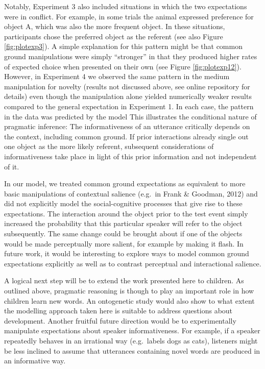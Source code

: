 \documentclass[10pt, letterpaper]{article}
\begin{document}
Notably, Experiment 3 also included situations in which the two
expectations were in conflict. For example, in some trials the animal
expressed preference for object A, which was also the more frequent
object. In these situations, participants chose the preferred object as
the referent (see also Figure \ref{fig:plotexp3}). A simple explanation
for this pattern might be that common ground manipulations were simply
``stronger'' in that they produced higher rates of expected choice when
presented on their own (see Figure \ref{fig:plotexp12}). However, in
Experiment 4 we observed the same pattern in the medium manipulation for
novelty (results not discussed above, see online repository for details)
even though the manipulation alone yielded numerically weaker results
compared to the general expectation in Experiment 1. In each case, the
pattern in the data was predicted by the model This illustrates the
conditional nature of pragmatic inference: The informativeness of an
utterance critically depends on the context, including common ground. If
prior interactions already single out one object as the more likely
referent, subsequent considerations of informativeness take place in
light of this prior information and not independent of it.

In our model, we treated common ground expectations as equivalent to
more basic manipulations of contextual salience (e.g.~in Frank \&
Goodman, 2012) and did not explicitly model the social-cognitive
processes that give rise to these expectations. The interaction around
the object prior to the test event simply increased the probability that
this particular speaker will refer to the object subsequently. The same
change could be brought about if one of the objects would be made
perceptually more salient, for example by making it flash. In future
work, it would be interesting to explore ways to model common ground
expectations explicitly as well as to contrast perceptual and
interactional salience.

A logical next step will be to extend the work presented here to
children. As outlined above, pragmatic reasoning is though to play an
important role in how children learn new words. An ontogenetic study
would also show to what extent the modelling approach taken here is
suitable to address questions about development. Another fruitful future
direction would be to experimentally manipulate expectations about
speaker informativeness. For example, if a speaker repeatedly behaves in
an irrational way (e.g.~labels dogs as cats), listeners might be less
inclined to assume that utterances containing novel words are produced
in an informative way.
\end{document}
